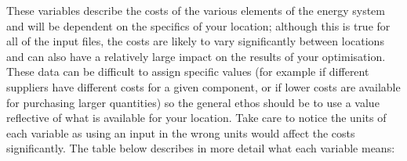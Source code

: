 \documentclass[letterpaper,10pt,english]{sphinxmanual}
\begin{document}
\begin{DUlineblock}{0em}
\item[] 
\end{DUlineblock}

\sphinxAtStartPar
These variables describe the costs of the various elements of the energy
system and will be dependent on the specifics of your location; although
this is true for all of the input files, the costs are likely to vary
significantly between locations and can also have a relatively large
impact on the results of your optimisation. These data can be difficult
to assign specific values (for example if different suppliers have
different costs for a given component, or if lower costs are available
for purchasing larger quantities) so the general ethos should be to use
a value reflective of what is available for your location. Take care to
notice the units of each variable as using an input in the wrong units
would affect the costs significantly. The table below describes in more
detail what each variable means:
\end{document}
